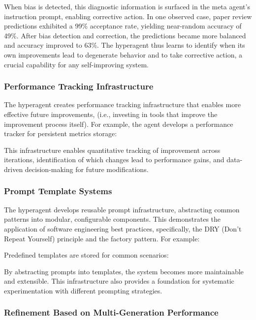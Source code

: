 \documentclass[]{fairmeta}
\begin{document}
When bias is detected, this diagnostic information is surfaced in the meta agent's instruction prompt, enabling corrective action. In one observed case, paper review predictions exhibited a 99\% acceptance rate, yielding near-random accuracy of 49\%. After bias detection and correction, the predictions became more balanced and accuracy improved to 63\%. The hyperagent thus learns to identify when its own improvements lead to degenerate behavior and to take corrective action, a crucial capability for any self-improving system.

\subsubsection{Performance Tracking Infrastructure}

The hyperagent creates performance tracking infrastructure that enables more effective future improvements, (i.e., investing in tools that improve the improvement process itself).
For example, the agent develops a performance tracker for persistent metrics storage:


This infrastructure enables quantitative tracking of improvement across iterations, identification of which changes lead to performance gains, and data-driven decision-making for future modifications.

\subsubsection{Prompt Template Systems}

The hyperagent develops reusable prompt infrastructure, abstracting common patterns into modular, configurable components. This demonstrates the application of software engineering best practices, specifically, the DRY (Don't Repeat Yourself) principle and the factory pattern.
For example:


Predefined templates are stored for common scenarios:


By abstracting prompts into templates, the system becomes more maintainable and extensible. This infrastructure also provides a foundation for systematic experimentation with different prompting strategies.

\subsubsection{Refinement Based on Multi-Generation Performance}
\end{document}
